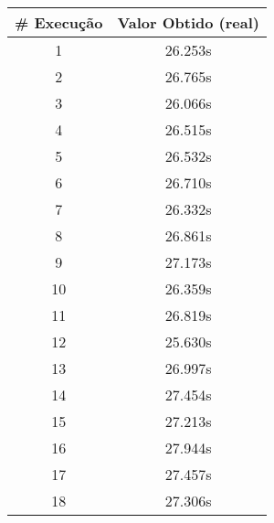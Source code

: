 \documentclass[11pt]{article}
\begin{document}
\begin{table}[!h]
\begin{center}
\begin{minipage}{0.48\textwidth}
\begin{tabular}{| c | c |}
			\hline
				\textbf{\# Execução} &  \textbf{Valor Obtido (real)} \\ \hline
				1 & 26.253s \\ \hline
				2 & 26.765s \\ \hline
				3 & 26.066s \\ \hline
				4 & 26.515s \\ \hline
				5 & 26.532s \\ \hline
				6 & 26.710s \\ \hline
				7 & 26.332s \\ \hline
				8 & 26.861s \\ \hline
				9 & 27.173s \\ \hline
				10 & 26.359s \\ \hline
				11 & 26.819s \\ \hline
				12 & 25.630s \\ \hline
				13 & 26.997s \\ \hline
				14 & 27.454s \\ \hline
				15 & 27.213s \\ \hline
				16 & 27.944s \\ \hline
				17 & 27.457s \\ \hline
				18 & 27.306s \\ \hline
			\end{tabular}
		\end{minipage}
	\end{center}
\end{table}
\end{document}

